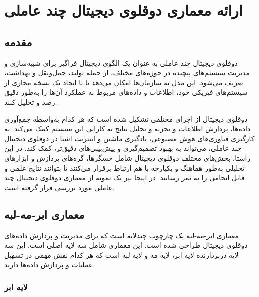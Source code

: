 
\chapter{ارائه معماری دوقلوی دیجیتال چند عاملی}


\section{مقدمه}

دوقلوی دیجیتال چند عاملی به عنوان یک الگوی دیجیتال فراگیر برای شبیه‌سازی و مدیریت سیستم‌های پیچیده در حوزه‌های مختلف، از جمله تولید، حمل‌ونقل و بهداشت، تعریف می‌شود. این مدل به سازمان‌ها امکان می‌دهد تا با ایجاد یک نسخه مجازی از سیستم‌های فیزیکی خود، اطلاعات و داده‌های مربوط به عملکرد آن‌ها را به‌طور دقیق رصد و تحلیل کنند.

دوقلوی دیجیتال از اجزای مختلفی تشکیل شده است که هر کدام به‌واسطه جمع‌آوری داده‌ها، پردازش اطلاعات و تجزیه و تحلیل نتایج به کارایی این سیستم کمک می‌کند. به کارگیری فناوری‌های هوش مصنوعی، یادگیری ماشین و اینترنت اشیا در دوقلوی دیجیتال چند عاملی، می‌تواند به بهبود تصمیم‌گیری و پیش‌بینی‌های دقیق‌تر، کمک کند. در این راستا، بخش‌های مختلف دوقلوی دیجیتال شامل حسگرها، گره‌های پردازش و ابزارهای تحلیلی به‌طور هماهنگ و یکپارچه با هم ارتباط برقرار می‌کنند تا بتوانند نتایج علمی و قابل انجامی را به ثمر رسانند. در اینجا نیز یک نمونه از معماری دوقلوی دیجیتال چند عاملی مورد بررسی قرار گرفته است.\cite{b15}

\section{معماری ابر-مه-لبه}
معماری ابر-مه-لبه
یک چارچوب چندلایه است که برای مدیریت و پردازش داده‌های دوقلوی دیجیتال طراحی شده است. این معماری شامل سه لایه اصلی است. این  سه لایه دربردارنده لایه ابر، لایه مه و لایه لبه است که هر کدام نقش مهمی در تسهیل عملیات و پردازش داده‌ها دارند.
\subsection{لایه ابر}

